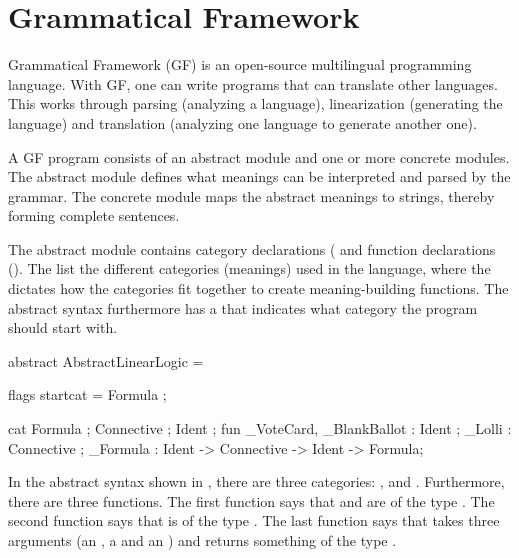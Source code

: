 \section{Grammatical Framework}
\label{03_02}


Grammatical Framework (GF) is an open-source multilingual programming language. With GF, one can write programs that can translate other languages. This works through parsing (analyzing a language), linearization (generating the language) and translation (analyzing one language to generate another one).

A GF program consists of an abstract module and one or more concrete modules. The abstract module defines what meanings can be interpreted and parsed by the grammar. The concrete module maps the abstract meanings to strings, thereby forming complete sentences.

The abstract module contains category declarations ( and function declarations (). The  list the different categories (meanings) used in the language, where the  dictates how the categories fit together to create meaning-building functions. The abstract syntax furthermore has a  that indicates what category the program should start with. 

\begin{lstgf}
abstract AbstractLinearLogic = {
    flags startcat = Formula ;
    
    cat 
        Formula ; Connective ; Ident ;
    fun 
        _VoteCard, _BlankBallot : Ident ;
        _Lolli : Connective ;
        _Formula : Ident -> Connective -> Ident -> Formula;
}
\end{lstgf}

In the abstract syntax shown in , there are three categories: ,  and . Furthermore, there are three functions. The first function says that  and  are of the type . The second function says that  is of the type . The last function says that  takes three arguments (an , a  and an ) and returns something of the type .

